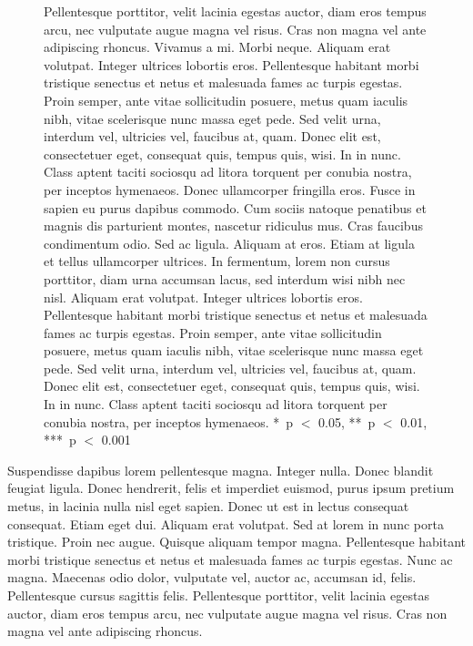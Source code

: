 \documentclass{biorxiv}
\begin{document}
\begin{figure}[t]
  \begin{minipage}{\onehalfcolumnwidth}
  \figureplaceholder{\onehalfcolumnwidth}{71.05mm}%
  \caption{
     Pellentesque porttitor, velit lacinia egestas auctor, diam
    eros tempus arcu, nec vulputate augue magna vel risus. Cras non magna
    vel ante adipiscing rhoncus. Vivamus a mi. Morbi neque. Aliquam erat
    volutpat. Integer ultrices lobortis eros. Pellentesque habitant morbi
    tristique senectus et netus et malesuada fames ac turpis egestas.
     Proin semper, ante vitae sollicitudin posuere, metus quam
    iaculis nibh, vitae scelerisque nunc massa eget pede. Sed velit urna,
    interdum vel, ultricies vel, faucibus at, quam. Donec elit est,
    consectetuer eget, consequat quis, tempus quis, wisi. In in nunc. Class
    aptent taciti sociosqu ad litora torquent per conubia nostra, per
    inceptos hymenaeos. Donec ullamcorper fringilla eros. Fusce in sapien eu
    purus dapibus commodo. Cum sociis natoque penatibus et magnis dis
    parturient montes, nascetur ridiculus mus. Cras faucibus condimentum
    odio.  Sed ac ligula. Aliquam at eros. Etiam at ligula et
    tellus ullamcorper ultrices. In fermentum, lorem non cursus porttitor,
    diam urna accumsan lacus, sed interdum wisi nibh nec nisl. 
    Aliquam erat volutpat. Integer ultrices lobortis eros. Pellentesque
    habitant morbi tristique senectus et netus et malesuada fames ac turpis
    egestas. Proin semper, ante vitae sollicitudin posuere, metus quam
    iaculis nibh, vitae scelerisque nunc massa eget pede. Sed velit urna,
    interdum vel, ultricies vel, faucibus at, quam. Donec elit est,
    consectetuer eget, consequat quis, tempus quis, wisi. In in nunc. Class
    aptent taciti sociosqu ad litora torquent per conubia nostra, per
    inceptos hymenaeos. *~p $<$ 0.05, **~p $<$ 0.01, ***~p
    $<$ 0.001}
  \label{fig:onehalf}
  \end{minipage}
\end{figure}

Suspendisse dapibus lorem pellentesque magna. Integer nulla. Donec blandit
feugiat ligula. Donec hendrerit, felis et imperdiet euismod, purus ipsum
pretium metus, in lacinia nulla nisl eget sapien. Donec ut est in lectus
consequat consequat. Etiam eget dui. Aliquam erat volutpat. Sed at lorem in
nunc porta tristique. Proin nec augue. Quisque aliquam tempor magna.
Pellentesque habitant morbi tristique senectus et netus et malesuada fames ac
turpis egestas. Nunc ac magna. Maecenas odio dolor, vulputate vel, auctor ac,
accumsan id, felis. Pellentesque cursus sagittis felis. Pellentesque
porttitor, velit lacinia egestas auctor, diam eros tempus arcu, nec vulputate
augue magna vel risus. Cras non magna vel ante adipiscing rhoncus.
\end{document}
